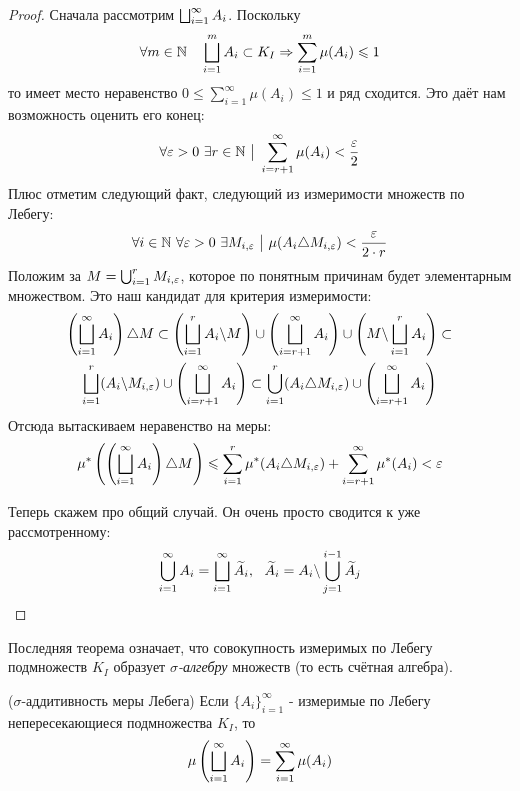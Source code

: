 \begin{proof}
	Сначала рассмотрим $\bigsqcup_{i = 1}^\infty A_i$. Поскольку
	\[
		\forall m \in \mathbb{N} \quad \bigsqcup_{i = 1}^m A_i \subset K_I \Rightarrow \sum_{i = 1}^m \mu(A_i) \leqslant 1
	\]
	то имеет место неравенство $0 \le \sum_{i = 1}^\infty \mu(A_i)\le 1$ и ряд сходится. Это даёт нам возможность оценить его конец:
	\[
		\forall \varepsilon > 0\ \exists r \in \mathbb{N} \ \big|\  \sum_{i = r + 1}^\infty \mu(A_i) < \frac{\varepsilon}{2}
	\]
	Плюс отметим следующий факт, следующий из измеримости множеств по Лебегу:
	\[
		\forall i \in \N\ \forall \eps > 0\ \exists M_{i, \eps} \such \mu(A_i \tr M_{i, \eps}) < \frac{\eps}{2 \cdot r}
	\]
	Положим за $M = \bigcup_{i = 1}^r M_{i, \varepsilon}$, которое по понятным причинам будет элементарным множеством. Это наш кандидат для критерия измеримости:
	\begin{multline*}
		\left(\bigsqcup_{i = 1}^\infty A_i\right) \triangle M \subset \left(\bigsqcup_{i = 1}^r A_i \backslash M\right) \cup \left(\bigsqcup_{i = r + 1}^\infty A_i\right) \cup \left(M \backslash \bigsqcup_{i = 1}^r A_i\right) \subset
		\\
		\bigsqcup_{i = 1}^r (A_i \backslash M_{i, \varepsilon}) \cup \left(\bigsqcup_{i = r + 1}^\infty A_i\right) \subset \bigcup_{i = 1}^r (A_i \triangle M_{i, \varepsilon}) \cup \left(\bigsqcup_{i = r + 1}^\infty A_i\right)
	\end{multline*}
	Отсюда вытаскиваем неравенство на меры:
	\[
		\mu^* \left(\left(\bigsqcup_{i = 1}^\infty A_i\right) \triangle M\right) \leqslant \sum_{i = 1}^r \mu^* (A_i \triangle M_{i, \varepsilon}) + \sum_{i = r + 1}^\infty \mu^* (A_i) < \varepsilon
	\]
	
	Теперь скажем про общий случай. Он очень просто сводится к уже рассмотренному:
	\[
		\bigcup_{i = 1}^\infty A_i = \bigsqcup_{i = 1}^\infty \widetilde{A}_i,\ \ \widetilde{A}_i = A_i \backslash \bigcup_{j = 1}^{i - 1} \widetilde{A}_j
	\]
\end{proof}

\begin{note}
	Последняя теорема означает, что совокупность измеримых по Лебегу подмножеств $K_I$ образует \textit{$\sigma$-алгебру} множеств (то есть счётная алгебра).
\end{note}

\begin{theorem} ($\sigma$-аддитивность меры Лебега)
	Если $\{A_i\}_{i = 1}^\infty$ - измеримые по Лебегу непересекающиеся подмножества $K_I$, то
	\[
		\mu\left(\bigsqcup_{i = 1}^\infty A_i\right) = \sum_{i = 1}^\infty \mu(A_i)
	\]
\end{theorem}

